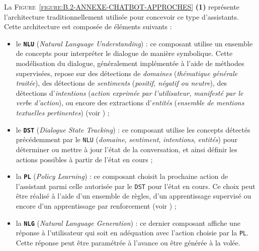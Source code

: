 			La \textsc{Figure~\ref{figure:B.2-ANNEXE-CHATBOT-APPROCHES}} \textbf{(1)} représente l'architecture traditionnellement utilisée pour concevoir ce type d'assistants.
			Cette architecture est composée de éléments suivants :
			\begin{itemize}
				\item le \textcolor{colorCarrotOrange}{\textbf{\texttt{NLU}}} (\textit{Natural Language Understanding}) :
					ce composant utilise un ensemble de concepts pour interpréter le dialogue de manière symbolique.
					Cette modélisation du dialogue, généralement implémentée à l'aide de méthodes supervisées, repose sur des détections de \textit{domaines} (\textit{thématique générale traitée}), des détections de \textit{sentiments} (\textit{positif, négatif ou neutre}), des détections d'\textit{intentions} (\textit{action exprimée par l'utilisateur, manifesté par le verbe d'action}), ou encore des extractions d'\textit{entités} (\textit{ensemble de mentions textuelles pertinentes}) (voir \cite{adamopoulou-moussiades:2020:overview-chatbot-technology}) ;
				\item le \textcolor{colorDarkPastelGreen}{\textbf{\texttt{DST}}} (\textit{Dialogue State Tracking}) :
					ce composant utilise les concepts détectés précédemment par le \texttt{NLU} (\textit{domaine}, \textit{sentiment}, \textit{intentions}, \textit{entités}) pour déterminer ou mettre à jour l'état de la conversation, et ainsi définir les actions possibles à partir de l'état en cours ;
				\item la \textcolor{colorDarkPastelGreen}{\textbf{\texttt{PL}}} (\textit{Policy Learning}) : 
					ce composant choisit la prochaine action de l'assistant parmi celle autorisée par le \texttt{DST} pour l'état en cours.
					Ce choix peut être réalisé à l'aide d'un ensemble de règles, d'un apprentissage supervisé ou encore d'un apprentissage par renforcement (voir \cite{brabra-etal:2022:dialogue-management-conversational}) ;
				\item la \textcolor{colorSilverLakeBlue}{\textbf{\texttt{NLG}}} (\textit{Natural Language Generation}) :
					ce dernier composant affiche une réponse à l'utilisateur qui soit en adéquation avec l'action choisie par la \texttt{PL}.
					Cette réponse peut être paramétrée à l'avance ou être générée à la volée.
			\end{itemize}
			
